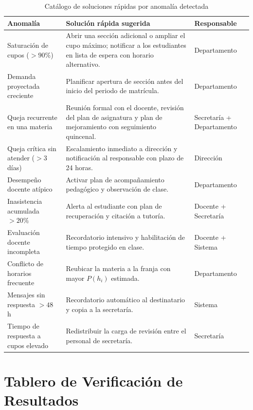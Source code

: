 \begin{table}[H]
\centering
\caption{Catálogo de soluciones rápidas por anomalía detectada}
\label{tab:catalogo-soluciones}
\small
\begin{tabularx}{\textwidth}{@{}p{3.2cm} X p{3.0cm}@{}}
\toprule
\rowcolor{verdeClaro}
\textbf{Anomalía} & \textbf{Solución rápida sugerida} & \textbf{Responsable} \\
\midrule
Saturación de cupos ($>90\%$) &
  Abrir una sección adicional o ampliar el cupo máximo; notificar a los
  estudiantes en lista de espera con horario alternativo. & Departamento \\
Demanda proyectada creciente &
  Planificar apertura de sección antes del inicio del periodo de matrícula. &
  Departamento \\
Queja recurrente en una materia &
  Reunión formal con el docente, revisión del plan de asignatura y plan de
  mejoramiento con seguimiento quincenal. & Secretaría + Departamento \\
Queja crítica sin atender ($>3$ días) &
  Escalamiento inmediato a dirección y notificación al responsable con plazo
  de 24 horas. & Dirección \\
Desempeño docente atípico &
  Activar plan de acompañamiento pedagógico y observación de clase. &
  Departamento \\
Inasistencia acumulada $>20\%$ &
  Alerta al estudiante con plan de recuperación y citación a tutoría. &
  Docente + Secretaría \\
Evaluación docente incompleta &
  Recordatorio intensivo y habilitación de tiempo protegido en clase. &
  Docente + Sistema \\
Conflicto de horarios frecuente &
  Reubicar la materia a la franja con mayor $P(h_i)$ estimada. & Departamento \\
Mensajes sin respuesta $>48$ h &
  Recordatorio automático al destinatario y copia a la secretaría. & Sistema \\
Tiempo de respuesta a cupos elevado &
  Redistribuir la carga de revisión entre el personal de secretaría. &
  Secretaría \\
\bottomrule
\end{tabularx}
\end{table}

\section{Tablero de Verificación de Resultados}

